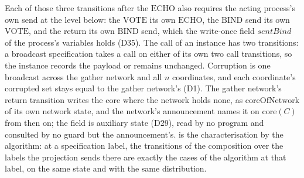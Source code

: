 \begin{definition}
  Each of those three transitions after the $\mathrm{ECHO}$ also requires the acting process's own send at the level below: the $\mathrm{VOTE}$ its own $\mathrm{ECHO}$, the $\mathrm{BIND}$ send its own $\mathrm{VOTE}$, and the return its own $\mathrm{BIND}$ send, which the write-once field $\mathit{sentBind}$ of the process's variables holds (D35).
  The call of an instance has two transitions: a broadcast specification takes a call on either of its own two call transitions, so the instance records the payload or remains unchanged.
  Corruption is one broadcast across the gather network and all $n$ coordinates, and each coordinate's corrupted set stays equal to the gather network's (D1).
  The gather network's return transition writes the core where the network holds none, as $\mathrm{coreOfNetwork}$ of its own network state, and the network's announcement names it on $\mathrm{core}(C)$ from then on; the field is auxiliary state (D29), read by no program and consulted by no guard but the announcement's.
   is the characterisation by the algorithm: at a specification label, the transitions of the composition over the labels the projection sends there are exactly the cases of the algorithm at that label, on the same state and with the same distribution.
\end{definition}
